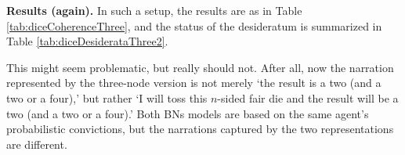 \documentclass[
  10pt,
]{scrartcl}
\begin{document}
\textbf{Results (again).} In such a setup, the results are as in Table \ref{tab:diceCoherenceThree}, and the status of the desideratum is summarized in Table \ref{tab:diceDesiderataThree2}.

\begin{table}[H]

\caption{\label{tab:diceCoherenceThree}Coherence scores for a regular die and a dodecahedron in the dice problem with three nodes (rounded).}
\centering
{}
\end{table}

\begin{table}[H]

\caption{\label{tab:diceDesiderataThree2}Desideratum satisfaction for three-node BNs in the dice problem.}
\centering
{}
\end{table}

\noindent This might seem problematic, but really should not. After all, now the narration represented by the three-node version is not merely `the result is a two (and a two or a four),' but rather `I will toss this \(n\)-sided fair die and the result will be a two (and a two or a four).' Both BNs models are based on the same agent's probabilistic convictions, but the narrations captured by the two representations are different.
\end{document}
